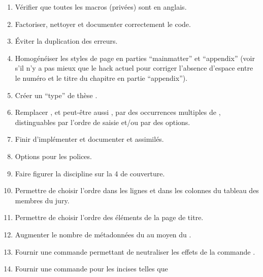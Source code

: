 \begin{enumerate}
\item Vérifier que toutes les macros (privées) sont en anglais.
\item Factoriser, nettoyer et documenter correctement le code.
\item Éviter la duplication des erreurs.
\item Homogénéiser les styles de page en parties \enquote{mainmatter} et
  \enquote{appendix} (voir s'il n'y a pas mieux que le hack actuel pour
  corriger l'absence d'espace entre le numéro et le titre du chapitre en partie
  \enquote{appendix}).
\item Créer un \enquote{type} de thèse .
\item Remplacer , et peut-être aussi , par des
  occurrences multiples de , distinguables par l'ordre de saisie
  et/ou par des  options.
\item Finir d'implémenter et documenter  et
  assimilés.
\item Options pour les polices.
\item Faire figurer la discipline sur la 4\ieme{} de couverture.
\item Permettre de choisir l'ordre dans les lignes et dans les colonnes du
  tableau des membres du jury.
\item Permettre de choisir l'ordre des éléments de la page de titre.
\item Augmenter le nombre de métadonnées du  au moyen du
  .
\item Fournir une commande  permettant de
  neutraliser les effets de la commande .
\item Fournir une commande  pour les incises telles que

\end{enumerate}
